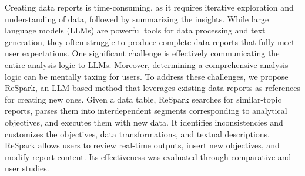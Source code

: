 Creating data reports is time-consuming, as it requires iterative exploration and understanding of data, followed by summarizing the insights. While large language models (LLMs) are powerful tools for data processing and text generation, they often struggle to produce complete data reports that fully meet user expectations. One significant challenge is effectively communicating the entire analysis logic to LLMs. Moreover, determining a comprehensive analysis logic can be mentally taxing for users. To address these challenges, we propose ReSpark, an LLM-based method that leverages existing data reports as references for creating new ones. Given a data table, ReSpark searches for similar-topic reports, parses them into interdependent segments corresponding to analytical objectives, and executes them with new data. It identifies inconsistencies and customizes the objectives, data transformations, and textual descriptions. ReSpark allows users to review real-time outputs, insert new objectives, and modify report content. Its effectiveness was evaluated through comparative and user studies.